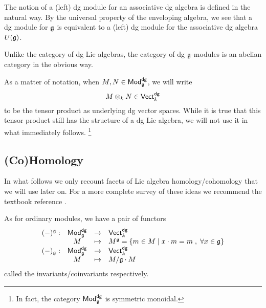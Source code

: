 \documentclass[11pt]{amsart}
\def\dgVect{{\sf Vect}^{\sf dg}}
\def\dgMod{{\sf Mod}^{\sf dg}}
\begin{document}
\begin{rmk}
The notion of a (left) dg module for an associative dg algebra is defined in the natural way.
By the universal property of the enveloping algebra, we see that a dg module for $\mathfrak g$ is equivalent to a (left) dg module for the associative dg algebra $U(\mathfrak g)$. 
\end{rmk}

Unlike the category of dg Lie algebras, the category of dg $\mathfrak g$-modules is an abelian category in the obvious way. 

As a matter of notation, when $M, N \in \dgMod_\fg$, we will write 
\[
M \tensor_k N \in \dgVect_k
\]
to be the tensor product as underlying dg vector spaces. 
While it is true that this tensor product still has the structure of a dg Lie algebra, we will not use it in what immediately follows. \footnote{In fact, the category $\dgMod_\fg$ is symmetric monoidal.}

%



\subsection{(Co)Homology}

In what follows we only recount facets of Lie algebra homology/cohomology that we will use later on. 
For a more complete survey of these ideas we recommend the textbook reference \cite{FF}.

As for ordinary modules, we have a pair of functors
\[
\begin{array}{cccl}
(-)^\fg : & \dgMod_\fg & \to & \dgVect_k  \\
& M & \mapsto & M^\fg = \{m \in M \; | \; x \cdot m = m \; , \; \forall x \in \fg\} \\
(-)_{\fg} : & \dgMod_{\fg} & \to & \dgVect_k \\
& M & \mapsto & M / \fg \cdot M 
\end{array}
\]
called the invariants/coinvariants respectively. 
\end{document}
